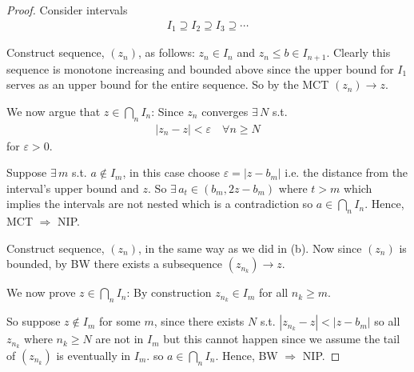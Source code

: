 \begin{enumerate}[label=(\alph*)]
    \item 
    \begin{proof}
        Consider intervals 
        \begin{align*}
            I_1 \supseteq I_2 \supseteq I_3 \supseteq \cdots
        \end{align*}

        Construct sequence, $(z_n)$, as follows: $z_n \in I_n$ and $z_n \leq b \in I_{n+1}$.
        Clearly this sequence is monotone increasing and bounded above since the upper bound for
        $I_1$ serves as an upper bound for the entire sequence. So by the MCT $(z_n)\rightarrow z$.

        We now argue that $z \in \bigcap_n I_n$: Since $z_n$ converges $\exists\, N$ s.t. 
        \begin{align*}
            |z_n - z| < \varepsilon \quad \forall n \geq N
        \end{align*}
        for $\varepsilon > 0$.
        
        Suppose $\exists \, m$ s.t. $a \not\in I_m$, in this case choose $\varepsilon = |z - b_m|$ 
        i.e. the distance from the interval's upper bound and $z$. So $\exists \, a_t \in (b_m, 2z-b_m)$
        where $t > m$ which implies the intervals are not nested which is a contradiction 
        so $a \in \bigcap_n I_n$. 
        Hence, MCT $\Rightarrow $ NIP.

        \item 
        Construct sequence, $(z_n)$, in the same way as we did in (b).
        Now since $(z_n)$ is bounded, by BW there exists a subsequence $(z_{n_k}) \rightarrow z$.
        
        We now prove $z \in \bigcap_n I_n$: By construction
        $ z_{n_k} \in I_m $ for all $n_k \geq m$. 
        
        So suppose $z \not\in I_m$ for some $m$, since there exists $N$ s.t. 
        $|z_{n_k} - z| < |z -b_m|$ so all $z_{n_k}$ where $n_k \geq N$ are not in $I_m$ but this cannot
        happen since we assume the tail of $(z_{n_k})$ is eventually in $I_m$.
        so $a \in \bigcap_n I_n$. 
        Hence, BW $\Rightarrow $ NIP.
    \end{proof}


\end{enumerate}
